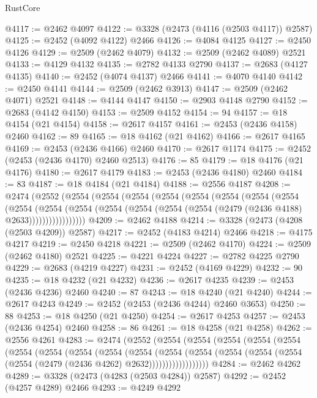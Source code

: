 \begin{lexlean}{RustCore}
\begin{coremodule}
@4117 := @2462 @4097
@4122 := @3328 (@2473 (@4116 (@2503 @4117)) @2587)
@4125 := @2452 (@4092 @4122) @2466
@4126 := @4084 @4125
@4127 := @2450 @4126
@4129 := @2509 (@2462 @4079)
@4132 := @2509 (@2462 @4089) @2521
@4133 := @4129 @4132
@4135 := @2782 @4133 @2790
@4137 := @2683 (@4127 @4135)
@4140 := @2452 (@4074 @4137) @2466
@4141 := @4070 @4140
@4142 := @2450 @4141
@4144 := @2509 (@2462 @3913)
@4147 := @2509 (@2462 @4071) @2521
@4148 := @4144 @4147
@4150 := @2903 @4148 @2790
@4152 := @2683 (@4142 @4150)
@4153 := @2509 @4152
@4154 := 94
@4157 := @18 @4154 (@21 @4154)
@4158 := @2617 @4157
@4161 := @2453 (@2436 @4158) @2460
@4162 := 89
@4165 := @18 @4162 (@21 @4162)
@4166 := @2617 @4165
@4169 := @2453 (@2436 @4166) @2460
@4170 := @2617 @1174
@4175 := @2452 (@2453 (@2436 @4170) @2460 @2513)
@4176 := 85
@4179 := @18 @4176 (@21 @4176)
@4180 := @2617 @4179
@4183 := @2453 (@2436 @4180) @2460
@4184 := 83
@4187 := @18 @4184 (@21 @4184)
@4188 := @2556 @4187
@4208 := @2474
    (@2552
      (@2554
        (@2554
          (@2554
            (@2554
              (@2554
                (@2554
                  (@2554
                    (@2554
                      (@2554
                        (@2554
                          (@2554
                            (@2554 (@2554 (@2554 (@2554 (@2479 (@2436 @4188) @2633)))))))))))))))))
@4209 := @2462 @4188
@4214 := @3328 (@2473 (@4208 (@2503 @4209)) @2587)
@4217 := @2452 (@4183 @4214) @2466
@4218 := @4175 @4217
@4219 := @2450 @4218
@4221 := @2509 (@2462 @4170)
@4224 := @2509 (@2462 @4180) @2521
@4225 := @4221 @4224
@4227 := @2782 @4225 @2790
@4229 := @2683 (@4219 @4227)
@4231 := @2452 (@4169 @4229)
@4232 := 90
@4235 := @18 @4232 (@21 @4232)
@4236 := @2617 @4235
@4239 := @2453 (@2436 @4236) @2460
@4240 := 87
@4243 := @18 @4240 (@21 @4240)
@4244 := @2617 @4243
@4249 := @2452 (@2453 (@2436 @4244) @2460 @3653)
@4250 := 88
@4253 := @18 @4250 (@21 @4250)
@4254 := @2617 @4253
@4257 := @2453 (@2436 @4254) @2460
@4258 := 86
@4261 := @18 @4258 (@21 @4258)
@4262 := @2556 @4261
@4283 := @2474
    (@2552
      (@2554
        (@2554
          (@2554
            (@2554
              (@2554
                (@2554
                  (@2554
                    (@2554
                      (@2554
                        (@2554
                          (@2554
                            (@2554
                              (@2554
                                (@2554 (@2554 (@2554 (@2479 (@2436 @4262) @2632))))))))))))))))))
@4284 := @2462 @4262
@4289 := @3328 (@2473 (@4283 (@2503 @4284)) @2587)
@4292 := @2452 (@4257 @4289) @2466
@4293 := @4249 @4292

\end{coremodule}
\end{lexlean}
